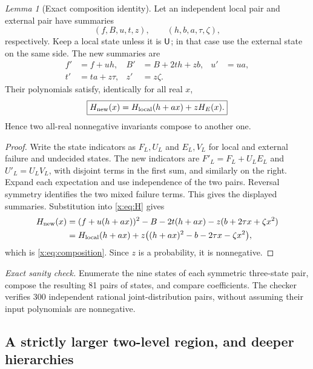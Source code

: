 \documentclass[11pt,a4paper]{article}
\theoremstyle{definition}\newtheorem{definition}[theorem]{Definition}
\theoremstyle{remark}\newtheorem{remark}[theorem]{Remark}
\newtheorem{xlemma}[xtheorem]{Lemma}
\theoremstyle{definition}\newtheorem{xexample}[xtheorem]{Example}\theoremstyle{plain}
\newcommand{\xcheck}[1]{\par\smallskip\textit{Exact sanity check.} #1\par}
\begin{document}
\begin{xlemma}[Exact composition identity]\label{x:lem:composition}
Let an independent local pair and external pair have summaries
\[
(f,B,u,t,z),\qquad (h,b,a,\tau,\zeta),
\]
respectively. Keep a local state unless it is $\mathsf U$; in that case use the external state on the same side. The new summaries are
\begin{align*}
f'&=f+uh,& B'&=B+2th+zb,& u'&=ua,\\
t'&=ta+z\tau,& z'&=z\zeta.
\end{align*}
Their polynomials satisfy, identically for all real $x$,
\begin{equation}\label{x:eq:composition}
\boxed{H_{\rm new}(x)=H_{\rm local}(h+ax)+zH_E(x).}
\end{equation}
Hence two all-real nonnegative invariants compose to another one.
\end{xlemma}
\begin{proof}
Write the state indicators as $F_L,U_L$ and $E_L,V_L$ for local and external failure and undecided states. The new indicators are $F'_L=F_L+U_LE_L$ and $U'_L=U_LV_L$, with disjoint terms in the first sum, and similarly on the right. Expand each expectation and use independence of the two pairs. Reversal symmetry identifies the two mixed failure terms. This gives the displayed summaries. Substitution into \eqref{x:eq:H} gives
\begin{align*}
H_{\rm new}(x)
&=(f+u(h+ax))^2-B-2t(h+ax)-z(b+2\tau x+\zeta x^2)\\
&=H_{\rm local}(h+ax)+z\bigl((h+ax)^2-b-2\tau x-\zeta x^2\bigr),
\end{align*}
which is \eqref{x:eq:composition}. Since $z$ is a probability, it is nonnegative.
\end{proof}
\xcheck{Enumerate the nine states of each symmetric three-state pair, compose the resulting 81 pairs of states, and compare coefficients. The checker verifies 300 independent rational joint-distribution pairs, without assuming their input polynomials are nonnegative.}

\subsection{A strictly larger two-level region, and deeper hierarchies}
\end{document}
